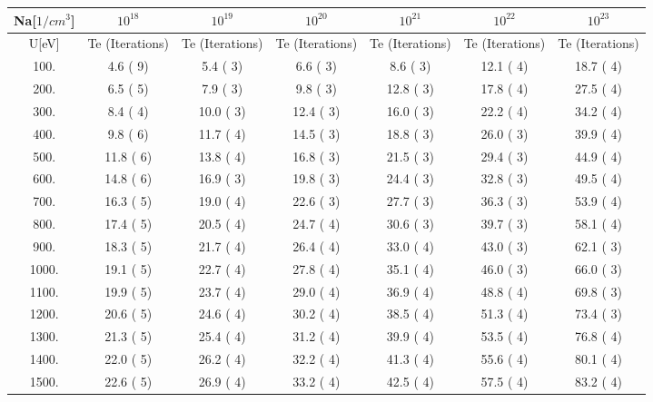\begin{tabular}{|c||c|c|c|c|c|c|}
\hline
Na[$1/cm^3$] & $10^{18}$ & $10^{19}$ & $10^{20}$ & $10^{21}$ & $10^{22}$ & $10^{23}$\tabularnewline
\hline
U[eV] & Te (Iterations) &  Te (Iterations) &  Te (Iterations) &  Te (Iterations) &  Te (Iterations) &  Te (Iterations) \tabularnewline
\hline
\hline
  100. &     4.6 (      9) &     5.4 (      3) &     6.6 (      3) &     8.6 (      3) &    12.1 (      4) &    18.7 (      4)\tabularnewline
\hline
  200. &     6.5 (      5) &     7.9 (      3) &     9.8 (      3) &    12.8 (      3) &    17.8 (      4) &    27.5 (      4)\tabularnewline
\hline
  300. &     8.4 (      4) &    10.0 (      3) &    12.4 (      3) &    16.0 (      3) &    22.2 (      4) &    34.2 (      4)\tabularnewline
\hline
  400. &     9.8 (      6) &    11.7 (      4) &    14.5 (      3) &    18.8 (      3) &    26.0 (      3) &    39.9 (      4)\tabularnewline
\hline
  500. &    11.8 (      6) &    13.8 (      4) &    16.8 (      3) &    21.5 (      3) &    29.4 (      3) &    44.9 (      4)\tabularnewline
\hline
  600. &    14.8 (      6) &    16.9 (      3) &    19.8 (      3) &    24.4 (      3) &    32.8 (      3) &    49.5 (      4)\tabularnewline
\hline
  700. &    16.3 (      5) &    19.0 (      4) &    22.6 (      3) &    27.7 (      3) &    36.3 (      3) &    53.9 (      4)\tabularnewline
\hline
  800. &    17.4 (      5) &    20.5 (      4) &    24.7 (      4) &    30.6 (      3) &    39.7 (      3) &    58.1 (      4)\tabularnewline
\hline
  900. &    18.3 (      5) &    21.7 (      4) &    26.4 (      4) &    33.0 (      4) &    43.0 (      3) &    62.1 (      3)\tabularnewline
\hline
 1000. &    19.1 (      5) &    22.7 (      4) &    27.8 (      4) &    35.1 (      4) &    46.0 (      3) &    66.0 (      3)\tabularnewline
\hline
 1100. &    19.9 (      5) &    23.7 (      4) &    29.0 (      4) &    36.9 (      4) &    48.8 (      4) &    69.8 (      3)\tabularnewline
\hline
 1200. &    20.6 (      5) &    24.6 (      4) &    30.2 (      4) &    38.5 (      4) &    51.3 (      4) &    73.4 (      3)\tabularnewline
\hline
 1300. &    21.3 (      5) &    25.4 (      4) &    31.2 (      4) &    39.9 (      4) &    53.5 (      4) &    76.8 (      4)\tabularnewline
\hline
 1400. &    22.0 (      5) &    26.2 (      4) &    32.2 (      4) &    41.3 (      4) &    55.6 (      4) &    80.1 (      4)\tabularnewline
\hline
 1500. &    22.6 (      5) &    26.9 (      4) &    33.2 (      4) &    42.5 (      4) &    57.5 (      4) &    83.2 (      4)\tabularnewline

\end{tabular}
